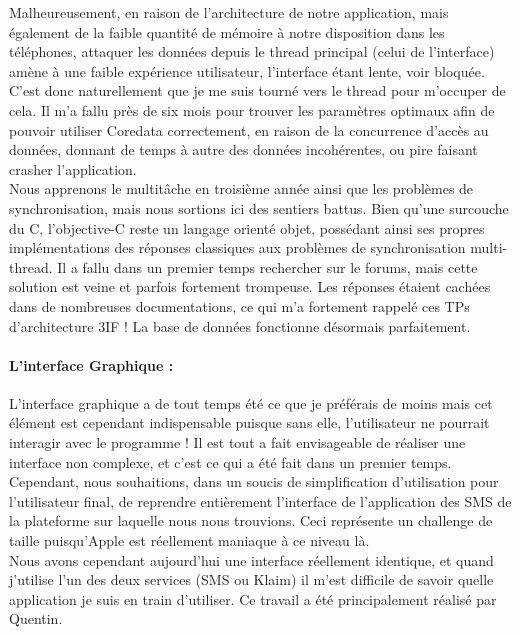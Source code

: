 \documentclass{article}
\begin{document}
		Malheureusement, en raison de l'architecture de notre application, mais également de la faible quantité de mémoire à notre disposition dans les téléphones, attaquer les données depuis le thread principal (celui de l'interface) amène à une faible expérience utilisateur, l'interface étant lente, voir bloquée. C'est donc naturellement que je me suis tourné vers le thread pour m'occuper de cela. Il m'a fallu près de six mois pour trouver les paramètres optimaux afin de pouvoir utiliser Coredata correctement, en raison de la concurrence d'accès au données, donnant de temps à autre des données incohérentes, ou pire faisant crasher l'application.\\
		
		Nous apprenons le multitâche en troisième année ainsi que les problèmes de synchronisation, mais nous sortions ici des sentiers battus. Bien qu'une surcouche du C, l'objective-C reste un langage orienté objet, possédant ainsi ses propres implémentations des réponses classiques aux problèmes de synchronisation multi-thread. Il a fallu dans un premier temps rechercher sur le forums, mais cette solution est veine et parfois fortement trompeuse. Les réponses étaient cachées dans de nombreuses documentations, ce qui m'a fortement rappelé ces TPs d'architecture 3IF ! La base de données fonctionne désormais parfaitement.\\
		
		\paragraph{L'interface Graphique :}
		L'interface graphique a de tout temps été ce que je préférais de moins mais cet élément est cependant indispensable puisque sans elle, l'utilisateur ne pourrait interagir avec le programme ! Il est tout a fait envisageable de réaliser une interface non complexe, et c'est ce qui a été fait dans un premier temps. Cependant, nous souhaitions, dans un soucis de simplification d'utilisation pour l'utilisateur final, de reprendre entièrement l'interface de l'application des SMS de la plateforme sur laquelle nous nous trouvions. Ceci représente un challenge de taille puisqu'Apple est réellement maniaque à ce niveau là. \\
		
		Nous avons cependant aujourd'hui une interface réellement identique, et quand j'utilise l'un des deux services (SMS ou Klaim) il m'est difficile de savoir quelle application je suis en train d'utiliser. Ce travail a été principalement réalisé par Quentin.\\
		
\end{document}
